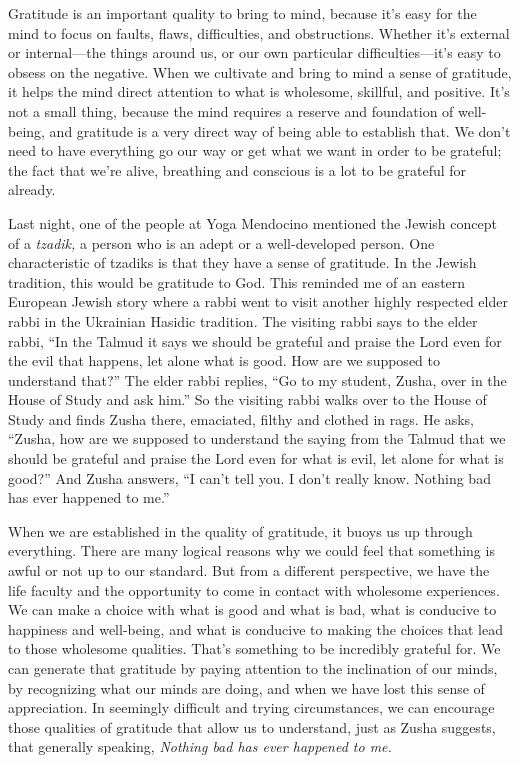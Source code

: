 Gratitude is an important quality to bring to mind, because it's easy 
for the mind to focus on faults, flaws, difficulties, and obstructions. 
Whether it's external or internal---the things around us, or our own 
particular difficulties---it's easy to obsess on the negative. When we 
cultivate and bring to mind a sense of gratitude, it helps the mind 
direct attention to what is wholesome, skillful, and positive. It's not 
a small thing, because the mind requires a reserve and foundation of 
well-being, and gratitude is a very direct way of being able to 
establish that. We don't need to have everything go our way or get what 
we want in order to be grateful; the fact that we're alive, breathing 
and conscious is a lot to be grateful for already.

Last night, one of the people at Yoga Mendocino mentioned the Jewish 
concept of a \emph{tzadik,} a person who is an adept or a 
well-developed person. One characteristic of tzadiks is that they have 
a sense of gratitude. In the Jewish tradition, this would be gratitude 
to God. This reminded me of an eastern European Jewish story where a 
rabbi went to visit another highly respected elder rabbi in the 
Ukrainian Hasidic tradition. The visiting rabbi says to the elder 
rabbi, ``In the Talmud it says we should be grateful and praise the 
Lord even for the evil that happens, let alone what is good. How are we 
supposed to understand that?'' The elder rabbi replies, ``Go to my 
student, Zusha, over in the House of Study and ask him.'' So the 
visiting rabbi walks over to the House of Study and finds Zusha there, 
emaciated, filthy and clothed in rags. He asks, ``Zusha, how are we 
supposed to understand the saying from the Talmud that we should be 
grateful and praise the Lord even for what is evil, let alone for what 
is good?'' And Zusha answers, ``I can't tell you. I don't really know. 
Nothing bad has ever happened to me.''

When we are established in the quality of gratitude, it buoys us up 
through everything. There are many logical reasons why we could feel 
that something is awful or not up to our standard. But from a different 
perspective, we have the life faculty and the opportunity to come in 
contact with wholesome experiences. We can make a choice with what is 
good and what is bad, what is conducive to happiness and well-being, 
and what is conducive to making the choices that lead to those 
wholesome qualities. That's something to be incredibly grateful for. We 
can generate that gratitude by paying attention to the inclination of 
our minds, by recognizing what our minds are doing, and when we have 
lost this sense of appreciation. In seemingly difficult and trying 
circumstances, we can encourage those qualities of gratitude that allow 
us to understand, just as Zusha suggests, that generally speaking, 
\emph{Nothing bad has ever happened to me.}

